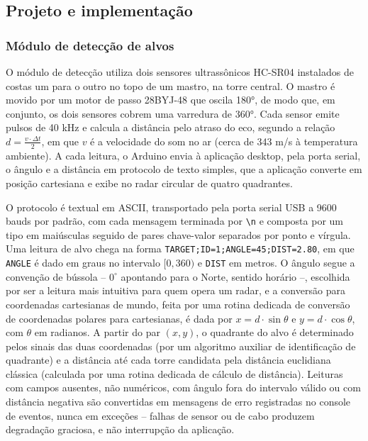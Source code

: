 \documentclass[12pt,a4paper]{article}
\begin{document}
\subsection{Projeto e implementação}

\subsubsection{Módulo de detecção de alvos}

O módulo de detecção utiliza dois sensores ultrassônicos HC-SR04 instalados de costas um para o
outro no topo de um mastro, na torre central. O mastro é movido por um motor de passo 28BYJ-48 que
oscila 180°, de modo que, em conjunto, os dois sensores cobrem uma varredura de 360°. Cada sensor
emite pulsos de 40 kHz e calcula a distância pelo atraso do eco, segundo a relação
$d = \frac{v \cdot \Delta t}{2}$, em que $v$ é a velocidade do som no ar (cerca de 343 m/s à
temperatura ambiente). A cada leitura, o Arduino envia à aplicação desktop, pela porta serial, o
ângulo e a distância em protocolo de texto simples, que a aplicação converte em posição cartesiana
e exibe no radar circular de quatro quadrantes.

O protocolo é textual em ASCII, transportado pela porta serial USB a 9600 bauds por padrão, com
cada mensagem terminada por \texttt{\textbackslash n} e composta por um tipo em maiúsculas seguido
de pares chave-valor separados por ponto e vírgula. Uma leitura de alvo chega na forma
\texttt{TARGET;ID=1;ANGLE=45;DIST=2.80}, em que \texttt{ANGLE} é dado em graus no intervalo
$[0, 360)$ e \texttt{DIST} em metros. O ângulo segue a convenção de bússola -- $0^\circ$ apontando
para o Norte, sentido horário --, escolhida por ser a leitura mais intuitiva para quem opera um
radar, e a conversão para coordenadas cartesianas de mundo, feita por uma rotina dedicada de
conversão de coordenadas polares para cartesianas, é dada por $x = d \cdot \sin\theta$ e
$y = d \cdot \cos\theta$, com $\theta$ em radianos. A partir do par $(x, y)$, o quadrante do alvo é
determinado pelos sinais das duas coordenadas (por um algoritmo auxiliar de identificação de
quadrante) e a distância até cada torre candidata pela distância euclidiana clássica (calculada
por uma rotina dedicada de cálculo de distância). Leituras com
campos ausentes, não numéricos, com ângulo fora do intervalo válido ou com distância negativa são
convertidas em mensagens de erro registradas no console de eventos, nunca em exceções -- falhas de
sensor ou de cabo produzem degradação graciosa, e não interrupção da aplicação.
\end{document}
